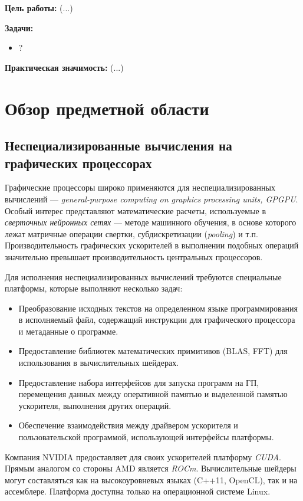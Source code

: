 \documentclass[a4paper,14pt]{extarticle}
\newenvironment{ul}{\begin{itemize}[noitemsep,topsep=0em]}{\end{itemize}\vspace{4mm}}
\begin{document}
\textbf{Цель работы:} (...)

\textbf{Задачи:}
\begin{ul}
\item ?
\end{ul}

\textbf{Практическая значимость:} (...)

\section{Обзор предметной области}

\subsection{Неспециализированные вычисления на графических процессорах}

Графические процессоры широко применяются для неспециализированных вычислений —
\textit{general-purpose computing on graphics processing units, GPGPU}.
Особый интерес представляют математические расчеты, используемые в
\textit{сверточных нейронных сетях} — методе машинного обучения, в основе которого
лежат матричные операции свертки, субдискретизации (\textit{pooling}) и т.п.
Производительность графических ускорителей в выполнении подобных операций
значительно превышает производительность центральных процессоров.

Для исполнения неспециализированных вычислений требуются специальные платформы,
которые выполняют несколько задач:
\begin{ul}
\item Преобразование исходных текстов на определенном языке программирования
  в исполняемый файл, содержащий инструкции для графического процессора и метаданные о программе.
\item Предоставление библиотек математических примитивов (BLAS, FFT)
  для использования в вычислительных шейдерах.
\item Предоставление набора интерфейсов для запуска программ на ГП, перемещения данных между
  оперативной памятью и выделенной памятью ускорителя, выполнения других операций.
\item Обеспечение взаимодействия между драйвером ускорителя и пользовательской программой,
  использующей интерфейсы платформы.
\end{ul}

Компания NVIDIA предоставляет для своих ускорителей платформу \textit{CUDA}. Прямым аналогом
со стороны AMD является \textit{ROCm}. Вычислительные шейдеры могут составляться как
на высокоуровневых языках (C++11, OpenCL), так и на ассемблере. Платформа доступна
только на операционной системе Linux.
\end{document}

